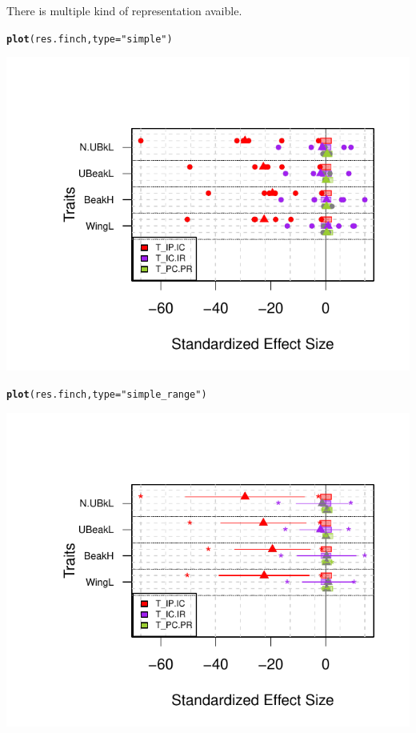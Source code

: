 \documentclass[12pt]{article}\usepackage[]{graphicx}\usepackage[]{color}
\makeatletter
\def\maxwidth{ %
  \ifdim\Gin@nat@width>\linewidth
    \linewidth
  \else
    \Gin@nat@width
  \fi
}
\newcommand{\hlstr}[1]{\textcolor[rgb]{0.192,0.494,0.8}{#1}}%
\newcommand{\hlstd}[1]{\textcolor[rgb]{0.345,0.345,0.345}{#1}}%
\newcommand{\hlkwc}[1]{\textcolor[rgb]{0.333,0.667,0.333}{#1}}%
\newcommand{\hlkwd}[1]{\textcolor[rgb]{0.737,0.353,0.396}{\textbf{#1}}}%
\newenvironment{kframe}{%
 \def\at@end@of@kframe{}%
 \ifinner\ifhmode%
  \def\at@end@of@kframe{\end{minipage}}%
  \begin{minipage}{\columnwidth}%
 \fi\fi%
 \def\FrameCommand##1{\hskip\@totalleftmargin \hskip-\fboxsep
 \colorbox{shadecolor}{##1}\hskip-\fboxsep
     \hskip-\linewidth \hskip-\@totalleftmargin \hskip\columnwidth}%
 \MakeFramed {\advance\hsize-\width
   \@totalleftmargin\z@ \linewidth\hsize
   \@setminipage}}%
 {\par\unskip\endMakeFramed%
 \at@end@of@kframe}
\newenvironment{knitrout}{}{} %
\makeatother
\begin{document}
There is multiple kind of representation avaible.
\begin{knitrout}
\color{fgcolor}\begin{kframe}
\begin{alltt}
\hlkwd{plot}\hlstd{(res.finch,} \hlkwc{type} \hlstd{=} \hlstr{"simple"}\hlstd{)}
\end{alltt}
\end{kframe}

{\centering \includegraphics[width=\maxwidth]{figure/unnamed-chunk-35-1} 

}


\begin{kframe}\begin{alltt}
\hlkwd{plot}\hlstd{(res.finch,} \hlkwc{type} \hlstd{=} \hlstr{"simple_range"}\hlstd{)}
\end{alltt}
\end{kframe}

{\centering \includegraphics[width=\maxwidth]{figure/unnamed-chunk-35-2} 

}
\end{knitrout}
\end{document}
